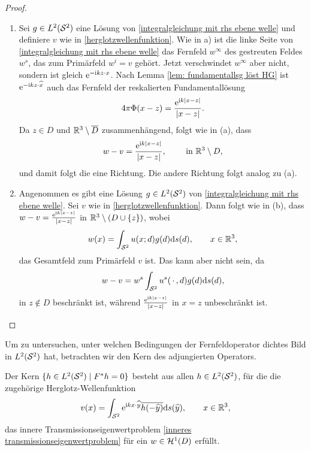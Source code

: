 \begin{proof}
\begin{enumerate}[label=(\alph*)]
		\item Sei \(g\in L^2(\mathcal{S}^2)\) eine Lösung von \eqref{integralgleichung mit rhs ebene welle} und definiere \(v\) wie in \eqref{herglotzwellenfunktion}. Wie in a) ist die linke Seite von \eqref{integralgleichung mit rhs ebene welle} das Fernfeld \(w^\infty\) des gestreuten Feldes \(w^s\), das zum Primärfeld \(w^i=v\) gehört. Jetzt verschwindet \(w^\infty\) aber nicht, sondern ist gleich \(\mathrm{e}^{-\mathrm{i} kz\cdot x}\).
		Nach Lemma \ref{lem: fundamentallsg löst HG} ist \(\mathrm{e}^{-\mathrm{i} kz\cdot\widehat{x}}\) auch das Fernfeld der reskalierten Fundamentallösung
		\begin{equation*}
			4\pi\Phi(x-z)=\frac{\mathrm{e}^{\mathrm{i} k|x-z|}}{|x-z|}.
		\end{equation*}
		Da \(z\in D\) und \(\mathbb{R}^3\setminus\overline{D}\) zusammenhängend, folgt wie in (a), dass 
		\begin{equation*}
			w-v=\frac{\mathrm{e}^{\mathrm{i} k|x-z|}}{|x-z|},\qquad\text{ in }\mathbb{R}^3\setminus D,
		\end{equation*}
		und damit folgt die eine Richtung. Die andere Richtung folgt analog zu (a).
		
		\item Angenommen es gibt eine Lösung \(g\in L^2(\mathcal{S}^2)\) von \eqref{integralgleichung mit rhs ebene welle}. Sei \(v\) wie in \eqref{herglotzwellenfunktion}. Dann folgt wie in (b), dass \(w-v=\frac{\mathrm{e}^{\mathrm{i} k|x-z|}}{|x-z|}\) in \(\mathbb{R}^3\setminus(D\cup\{z\})\), wobei
		\begin{equation*}
			w(x)=\int_{\mathcal{S}^2}u(x;d)g(d)\mathrm{d}s(d),\qquad x\in\mathbb{R}^3,
		\end{equation*}
		das Gesamtfeld zum Primärfeld \(v\) ist. Das kann aber nicht sein, da 
		\begin{equation*}
			w-v=w^s\int_{\mathcal{S}^2}u^s(\,\cdot\,,d)g(d)\mathrm{d}s(d),
		\end{equation*}
		in \(z\notin D\) beschränkt ist, während \(\frac{\mathrm{e}^{\mathrm{i} k|x-z|}}{|x-z|}\) in \(x=z\) unbeschränkt ist.
	\end{enumerate}
\end{proof}
Um zu untersuchen, unter welchen Bedingungen der Fernfeldoperator dichtes Bild in \(L^2(\mathcal{S}^2)\) hat, betrachten wir den Kern des adjungierten Operators.
\begin{satz}
	Der Kern \(\{h\in L^2(\mathcal{S}^2)\mid F^\ast h=0\}\) besteht aus allen \(h\in L^2(\mathcal{S}^2)\), für die die zugehörige Herglotz-Wellenfunktion
	\begin{equation*}
		v(x)=\int_{\mathcal{S}^2}\mathrm{e}^{\mathrm{i} kx\cdot \widehat{y}}\overline{h(-\widehat{y})}\mathrm{d}s(\widehat{y}),\qquad x\in\mathbb{R}^3,
	\end{equation*}
	das innere Transmissionseigenwertproblem \eqref{inneres transmissionseigenwertproblem} für ein \(w\in\mathcal{H}^1(D)\) erfüllt.
\end{satz}
